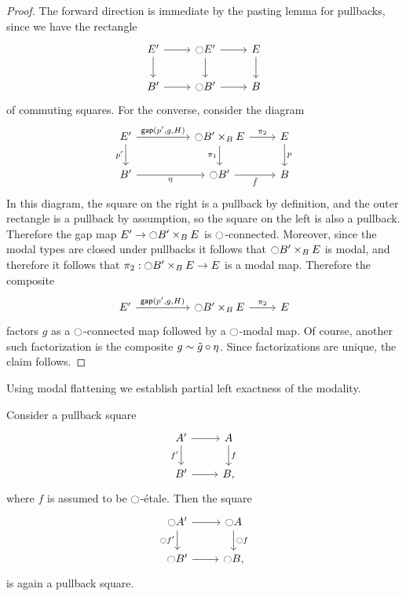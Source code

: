 \documentclass[9pt,twosided]{amsart}
\begin{document}
\begin{proof}
  The forward direction is immediate by the pasting lemma for pullbacks, since we have the rectangle
  \begin{equation*}
    \begin{tikzcd}
      E' \arrow[r] \arrow[d] & \modal E' \arrow[r] \arrow[d] & E \arrow[d] \\
      B' \arrow[r] & \modal B' \arrow[r] & B
    \end{tikzcd}
  \end{equation*}
  of commuting squares.
For the converse, consider the diagram
\begin{equation*}
\begin{tikzcd}
E' \arrow[r,"{\mathsf{gap}(p',g,H)}"] \arrow[d,swap,"{p'}"] &[2.5em] \modal B'\times_{B} E \arrow[r,"\pi_2"] \arrow[d,swap,"\pi_1"] & E \arrow[d,"p"] \\
B' \arrow[r,swap,"\modalunit"] & \modal B' \arrow[r,swap,"\tilde{f}"] & B
\end{tikzcd}
\end{equation*}
In this diagram, the square on the right is a pullback by definition, and the outer rectangle is a pullback by assumption, so the square on the left is also a pullback. Therefore the gap map $E'\to {\ensuremath{\ocircle}} B'\times_B E$ is ${\ocircle}$-connected. Moreover, since the modal types are closed under pullbacks it follows that ${\ocircle} B'\times_B E$ is modal, and therefore it follows that $\pi_2:{\ocircle} B'\times_B E\to E$ is a modal map. Therefore the composite
\begin{equation*}
\begin{tikzcd}
E' \arrow[r,"{\mathsf{gap}(p',g,H)}"] &[2.5em] \modal B'\times_{B} E \arrow[r,"\pi_2"] & E 
\end{tikzcd}
\end{equation*}
factors $g$ as a ${\ocircle}$-connected map followed by a ${\ocircle}$-modal map. Of course, another such factorization is the composite $g\sim \tilde{g}\circ{\eta_{}}$. Since factorizations are unique, the claim follows.
\end{proof}

Using modal flattening we establish partial left exactness of the modality.

\begin{cor}\label{cor:etale_lex}
Consider a pullback square
\begin{equation*}
\begin{tikzcd}
A' \arrow[d,swap,"{f'}"] \arrow[r] & A \arrow[d,"f"] \\
B' \arrow[r] & B,
\end{tikzcd}
\end{equation*}
where $f$ is assumed to be ${\ocircle}$-\'etale. Then the square
\begin{equation*}
\begin{tikzcd}
\modal A' \arrow[d,swap,"{\modal f'}"] \arrow[r] & \modal A \arrow[d,"\modal f"] \\
\modal B' \arrow[r] & \modal B,
\end{tikzcd}
\end{equation*}
is again a pullback square.
\end{cor}
\end{document}
